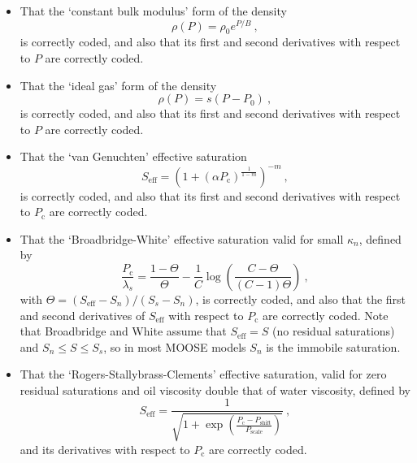 \documentclass[]{scrreprt}
\begin{document}
\begin{itemize}
\item That the `constant bulk modulus' form of the density
\begin{equation}
\rho(P) = \rho_{0}e^{P/B} \ ,
\end{equation}
is correctly coded, and also that its first and second derivatives
with respect to $P$ are correctly coded.

\item That the `ideal gas' form of the density
\begin{equation}
\rho(P) = s(P-P_{\mathrm{0}}) \ ,
\end{equation}
is correctly coded, and also that its first and second derivatives
with respect to $P$ are correctly coded.

\item That the `van Genuchten' effective saturation
\begin{equation}
S_{\mathrm{eff}} = \left(1 + (\alpha
P_{\mathrm{c}})^{\frac{1}{1-m}}\right)^{-m} \ ,
\end{equation}
is correctly coded, and also that its first and second derivatives
with respect to $P_{\mathrm{c}}$ are correctly coded.

\item That the `Broadbridge-White' effective saturation valid for
  small $\kappa_{n}$, defined by
\begin{equation}
\frac{P_{\mathrm{c}}}{\lambda_{s}} = \frac{1-\Theta}{\Theta} - \frac{1}{C}\log
\left( \frac{C-\Theta}{(C-1)\Theta} \right) \ ,
\end{equation}
with $\Theta = (S_{\mathrm{eff}} - S_{n})/(S_{s}-S_{n})$, 
is correctly coded, and also that the first and second derivatives of
$S_{\mathrm{eff}}$ with respect to $P_{\mathrm{c}}$ are correctly
coded.  Note that Broadbridge and White assume that
$S_{\mathrm{eff}}=S$ (no residual saturations) and $S_{n}\leq S \leq
S_{s}$, so in most MOOSE models $S_{n}$ is the immobile saturation.

\item That the `Rogers-Stallybrass-Clements' effective saturation,
  valid for zero residual saturations and oil viscosity double that of
  water viscosity, defined by
\begin{equation}
S_{\mathrm{eff}} = \frac{1}{\sqrt{1 +
    \exp\left(\frac{P_{\mathrm{c}}-P_{\mathrm{shift}}}{P_{\mathrm{scale}}}\right)}}
\ ,
\end{equation}
and its derivatives with respect to $P_{\mathrm{c}}$ are correctly coded.


\end{itemize}
\end{document}
